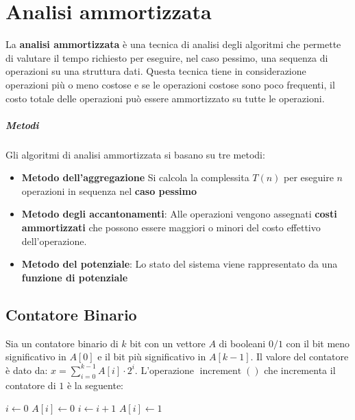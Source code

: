 \chapter{Analisi ammortizzata}
\label{ch:analisi-ammortizzata}
\thispagestyle{chapterInit}

La \textbf{analisi ammortizzata} è una tecnica di analisi degli algoritmi che permette di valutare il tempo richiesto per eseguire, nel caso pessimo, una sequenza di operazioni su una struttura dati. Questa tecnica tiene in considerazione operazioni più o meno costose e se le operazioni costose sono poco frequenti, il costo totale delle operazioni può essere ammortizzato su tutte le operazioni.
\paragraph{Metodi} Gli algoritmi di analisi ammortizzata si basano su tre metodi:
\begin{itemize}
    \item \textbf{Metodo dell'aggregazione} Si calcola la complessita $T(n)$ per eseguire $n$ operazioni in sequenza nel \textbf{caso pessimo}
    \item \textbf{Metodo degli accantonamenti}: Alle operazioni vengono assegnati \textbf{costi ammortizzati} che possono essere maggiori o minori del costo effettivo dell'operazione.
    \item \textbf{Metodo del potenziale}: Lo stato del sistema viene rappresentato da una \textbf{funzione di potenziale}
\end{itemize}
\section{Contatore Binario}
    Sia un contatore binario di $k$ bit con un vettore $A$ di booleani $0/1$ con il bit meno significativo in $A[0]$ e il bit più significativo in $A[k-1]$. Il valore del contatore è dato da: $ x = \sum_{i=0}^{k-1} A[i] \cdot 2^i$. L'operazione $\operatorname{increment}()$ che incrementa il contatore di $1$ è la seguente:
    \begin{algorithm}
        \caption{$\operatorname{increment}(\Int[] A,\Int k)$}
        \begin{algorithmic}
            \State \Int $i \gets 0$
                \State $A[i] \gets 0$
                \State $i \gets i+1$
            \EndWhile
                \State $A[i] \gets 1$
            \EndIf
        \end{algorithmic}
    \end{algorithm}

